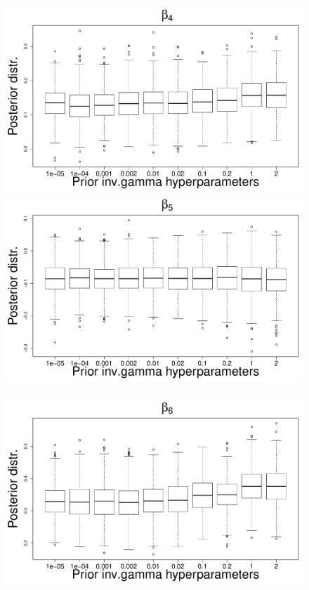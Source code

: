\documentclass{statsoc}
\numberwithin{figure}{section}
\numberwithin{table}{section}
\begin{document}
\begin{figure}
\includegraphics[scale=0.25]{Sensitivity/beta_4_sensitivity.pdf}\\
\includegraphics[scale=0.25]{Sensitivity/beta_5_sensitivity.pdf}~
\includegraphics[scale=0.25]{Sensitivity/beta_6_sensitivity.pdf}\\

\end{figure}
\end{document}
